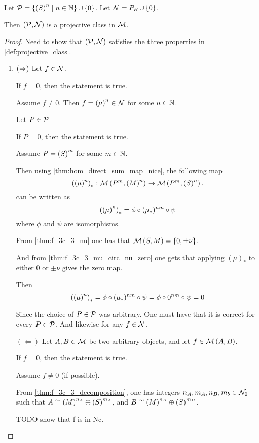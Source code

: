\begin{example} %
    Let \( {\mathcal{P}} = \left\{  \left(  S  \right)^n \mid n \in {\mathbb{N}}  \right\} \mathop{\cup}\limits \left\{  0  \right\} \). Let \( {\mathcal{N}} = P_B \mathop{\cup}\limits \left\{  0  \right\} \).

    Then \( \left(  {\mathcal{P}}, {\mathcal{N}} \right) \) is a projective class in \( {\mathcal{M}} \).
\end{example}
\begin{proof}
    Need to show that \( \left(  {\mathcal{P}}, {\mathcal{N}}  \right) \) satisfies the three properties in \autoref{def:projective_class}.

    \begin{enumerate}
        \item {
            \( \left(  \Rightarrow  \right) \) Let \( f \in {\mathcal{N}} \).

            If \( f = 0 \), then the statement is true.

            Assume \( f \neq 0 \). Then \( f = \left(  \mu  \right)^n \in {\mathcal{N}} \) for some \( n \in {\mathbb{N}} \).
            
            Let \( P \in {\mathcal{P}} \)
            
            If \( P = 0 \), then the statement is true.

            Assume \( P = \left(  S  \right)^m \) for some \( m \in {\mathbb{N}} \).

            Then using \autoref{thm:hom_direct_sum_map_nice}, the following map
            \[
                \left(  \left(  \mu  \right)^n  \right)_* : {\mathcal{M}}\left( P^m, \left( M \right)^n  \right) \to {\mathcal{M}}\left( P^m, \left( S \right)^n  \right).
            \]
            can be written as
            \[
                \left(  \left(  \mu  \right)^n  \right)_* = \phi \circ (\mu_*)^{nm} \circ \psi
            \]
            where \( \phi \) and \( \psi \) are isomorphisms.

            From \autoref{thm:f_3c_3_nu} one has that \( {\mathcal{M}}\left(  S, M  \right) = \left\{  0, \pm \nu  \right\} \).

            And from \autoref{thm:f_3c_3_mu_circ_nu_zero} one gets that applying \( (\mu)_* \) to either \( 0 \) or \( \pm \nu \) gives the zero map.

            Then
            \[
                \left(  \left(  \mu  \right)^n  \right)_* = \phi \circ (\mu_*)^{nm} \circ \psi = \phi \circ 0^{nm} \circ \psi = 0
            \]

            Since the choice of \( P \in {\mathcal{P}} \) was arbitrary. One must have that it is correct for every \( P \in {\mathcal{P}} \). And likewise for any \( f \in {\mathcal{N}} \).

            \( ( \Leftarrow ) \) Let \( A, B \in {\mathcal{M}} \) be two arbitrary objects, and let \( f \in {\mathcal{M}}\left(  A, B  \right) \).

            If \( f = 0 \), then the statement is true. 
            
            Assume \( f \neq 0 \) (if possible). %

            From \autoref{thm:f_3c_3_decomposition}, one has integers \( n_A, m_A, n_B, m_b \in {\mathcal{N}}_0 \) such that \( A \cong \left(  M  \right)^{n_A} \oplus \left(  S  \right)^{m_A} \), and \( B \cong \left(  M  \right)^{n_B} \oplus \left(  S  \right)^{m_B} \).

            TODO show that f is in Nc.
        }
    \end{enumerate}
\end{proof}